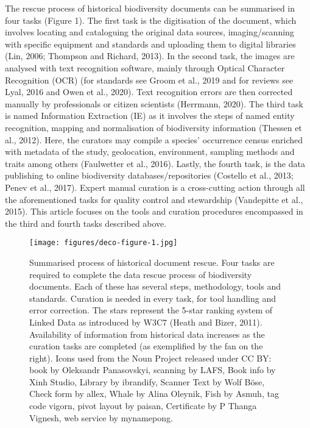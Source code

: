 The rescue process of historical biodiversity documents can be summarised in four tasks (Figure 1). The first task is the digitisation of the document, which involves locating and cataloguing the original data sources, imaging/scanning with specific equipment and standards and uploading them to digital libraries (Lin, 2006; Thompson and Richard, 2013). In the second task, the images are analysed with text recognition software, mainly through Optical Character Recognition (OCR) (for standards see Groom et al., 2019 and for reviews see Lyal, 2016 and Owen et al., 2020). Text recognition errors are then corrected manually by professionals or citizen scientists (Herrmann, 2020). The third task is named Information Extraction (IE) as it involves the steps of named entity recognition, mapping and normalisation of biodiversity information (Thessen et al., 2012). Here, the curators may compile a species’ occurrence census enriched with metadata of the study, geolocation, environment, sampling methods and traits among others (Faulwetter et al., 2016). Lastly, the fourth task, is the data publishing to online biodiversity databases/repositories (Costello et al., 2013; Penev et al., 2017). Expert manual curation is a cross-cutting action through all the aforementioned tasks for quality control and stewardship (Vandepitte et al., 2015). This article focuses on the tools and curation procedures encompassed in the third and fourth tasks described above.
   \begin{figure}[h]
      \centering
      \texttt{[image: figures/deco-figure-1.jpg]}
      \caption[Historical document rescue process]{
           Summarised process of historical document rescue. Four tasks are required to complete the data rescue process of biodiversity documents. Each of these has several steps, methodology, tools and standards. Curation is needed in every task, for tool handling and error correction. The stars represent the 5-star ranking system of Linked Data as introduced by W3C7 (Heath and Bizer, 2011). Availability of information from historical data increases as the curation tasks are completed (as exemplified by the fan on the right). Icons used from the Noun Project released under CC BY: book by Oleksandr Panasovskyi, scanning by LAFS, Book info by Xinh Studio, Library by ibrandify, Scanner Text by Wolf Böse, Check form by allex, Whale by Alina Oleynik, Fish by Asmuh, tag code vigorn, pivot layout by paisan, Certificate by P Thanga Vignesh, web service by mynamepong.
      }
      \label{fig:deco-rescue-pipeline}
   \end{figure}

